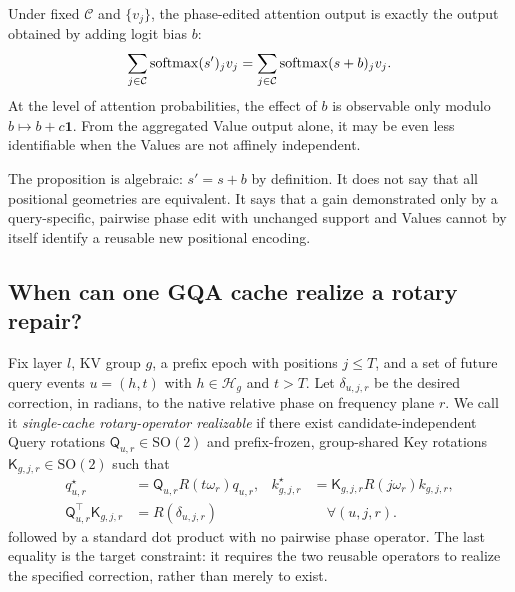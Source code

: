 \begin{proposition}
\label{prop:phase-bias}
Under fixed $\mathcal C$ and $\{v_j\}$, the phase-edited attention output is
exactly the output obtained by adding logit bias $b$:
\begin{equation}
  \sum_{j\in\mathcal C}\operatorname{softmax}(s')_jv_j
  =\sum_{j\in\mathcal C}\operatorname{softmax}(s+b)_jv_j.
  \label{eq:phase-bias-equivalence}
\end{equation}
At the level of attention probabilities, the effect of $b$ is observable only
modulo $b\mapsto b+c\mathbf 1$.  From the aggregated Value output alone, it may
be even less identifiable when the Values are not affinely independent.
\end{proposition}

The proposition is algebraic: $s'=s+b$ by definition.  It does not say that
all positional geometries are equivalent.  It says that a gain demonstrated
only by a query-specific, pairwise phase edit with unchanged support and Values
cannot by itself identify a reusable new positional encoding.

\subsection{When can one GQA cache realize a rotary repair?}

Fix layer $l$, KV group $g$, a prefix epoch with positions $j\le T$, and a set
of future query events $u=(h,t)$ with $h\in\mathcal H_g$ and $t>T$.  Let
$\delta_{u,j,r}$ be the desired correction, in radians, to the native relative
phase on frequency plane $r$.  We call it \emph{single-cache rotary-operator
realizable} if there exist candidate-independent Query rotations
$\mathsf Q_{u,r}\in\mathrm{SO}(2)$ and prefix-frozen, group-shared Key rotations
$\mathsf K_{g,j,r}\in\mathrm{SO}(2)$ such that
\begin{equation}
  \begin{aligned}
  q^\star_{u,r}&=\mathsf Q_{u,r}R(t\omega_r)q_{u,r},&
  k^\star_{g,j,r}&=\mathsf K_{g,j,r}R(j\omega_r)k_{g,j,r},\\
  \mathsf Q_{u,r}^{\top}\mathsf K_{g,j,r}
  &=R(\delta_{u,j,r})&&\quad\forall(u,j,r).
  \end{aligned}
  \label{eq:cache-operator}
\end{equation}
followed by a standard dot product with no pairwise phase operator.  The last
equality is the target constraint: it requires the two reusable operators to
realize the specified correction, rather than merely to exist.

